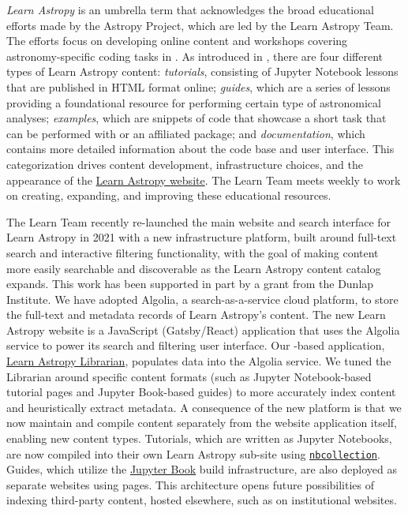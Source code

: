\documentclass[modern]{aastex631}
\begin{document}
\textit{Learn Astropy} is an umbrella term that acknowledges the broad
educational efforts made by the Astropy Project, which are led by the Learn
Astropy Team.
The efforts focus on developing online content and workshops covering
astronomy-specific coding tasks in \python.
As introduced in \citet{astropy:2018}, there are four different types of
Learn Astropy content: \textit{tutorials}, consisting of Jupyter Notebook
lessons that are published in HTML format online; \textit{guides}, which are a
series of lessons providing a foundational resource for performing certain
type of astronomical analyses; \textit{examples}, which are snippets of code
that showcase a short task that can be performed with \astropypkg or an affiliated
package; and \textit{documentation}, which contains more detailed information
about the code base and user interface.
This categorization drives content development, infrastructure choices, and the
appearance of the \href{https://learn.astropy.org}{Learn Astropy website}.
The Learn Team meets weekly to work on creating, expanding, and improving these
educational resources.

The Learn Team recently re-launched the main website and search interface for
Learn Astropy in 2021 with a new infrastructure platform, built around full-text
search and interactive filtering functionality, with the goal of making content
more easily searchable and discoverable as the Learn Astropy content catalog
expands.
This work has been supported in part by a grant from the Dunlap Institute.
We have adopted Algolia, a search-as-a-service cloud platform, to store the
full-text and metadata records of Learn Astropy's content.
The new Learn Astropy website is a JavaScript (Gatsby/React) application that
uses the Algolia service to power its search and filtering user interface.
Our \python-based application,
\href{https://github.com/astropy/learn-astropy-librarian/}{Learn Astropy
Librarian}, populates data into the Algolia service. We tuned the Librarian
around specific content formats (such as Jupyter Notebook-based tutorial pages
and Jupyter Book-based guides) to more accurately index content and
heuristically extract metadata.
A consequence of the new platform is that we now maintain and compile content
separately from the website application itself, enabling new content types.
Tutorials, which are written as Jupyter Notebooks, are now compiled into their
own Learn Astropy sub-site using
\href{https://github.com/astropy/nbcollection}{\texttt{nbcollection}}.
Guides, which utilize the \href{https://jupyterbook.org/}{Jupyter Book} build
infrastructure, are also deployed as separate websites using \github pages.
This architecture opens future possibilities of indexing third-party content,
hosted elsewhere, such as on institutional websites.
\end{document}
